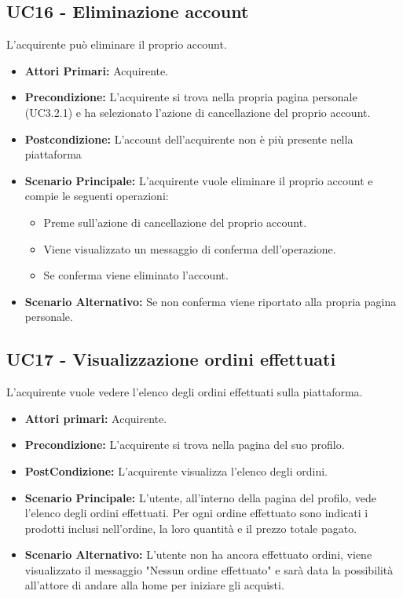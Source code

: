 \subsection{UC16 - Eliminazione account}
\label{UC16}
L'acquirente può eliminare il proprio account.
\begin{itemize}
    \item \textbf{Attori Primari:} Acquirente.
    \item \textbf{Precondizione:} L'acquirente si trova nella propria pagina personale (UC3.2.1) e ha selezionato l'azione di cancellazione del proprio account. 
    \item \textbf{Postcondizione:} L'account dell'acquirente non è più presente nella piattaforma
    \item \textbf{Scenario Principale:} L'acquirente vuole eliminare il proprio account e compie le seguenti operazioni:
    \begin{itemize}
        \item Preme sull'azione di cancellazione del proprio account.
        \item Viene visualizzato un messaggio di conferma dell'operazione.
        \item Se conferma viene eliminato l'account.
    \end{itemize}
    \item \textbf{Scenario Alternativo:} Se non conferma viene riportato alla propria pagina personale.
\end{itemize}

\subsection{UC17 - Visualizzazione ordini effettuati}
\label{UC17}
L'acquirente vuole vedere l'elenco degli ordini effettuati sulla piattaforma.
\begin{itemize}
    \item \textbf{Attori primari:} Acquirente.
    \item \textbf{Precondizione:} L'acquirente si trova nella pagina del suo profilo.
    \item \textbf{PostCondizione:} L'acquirente visualizza l'elenco degli ordini.
    \item \textbf{Scenario Principale:} L'utente, all'interno della pagina del profilo, vede l'elenco degli ordini effettuati.
        Per ogni ordine effettuato sono indicati i prodotti inclusi nell'ordine, la loro quantità e il prezzo totale pagato.
    \item \textbf{Scenario Alternativo:} L'utente non ha ancora effettuato ordini, viene visualizzato il messaggio "Nessun ordine effettuato" e sarà data la possibilità all'attore di andare alla home per iniziare gli acquisti.
\end{itemize}
